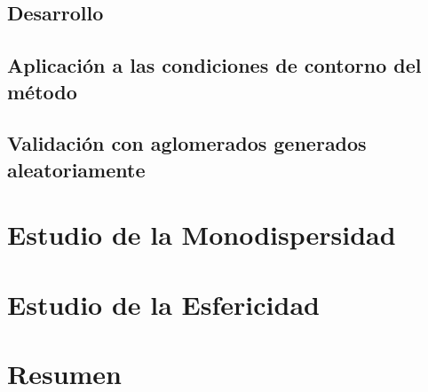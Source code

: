 \subsection{Desarrollo}
\subsection{Aplicación a las condiciones de contorno del método}
\subsection{Validación con aglomerados generados aleatoriamente}
\section{Estudio de la Monodispersidad}\label{sec:EstudioMonodispersidad}
\section{Estudio de la Esfericidad}\label{sec:EstudioEsfericidad}
\section{Resumen}



\newpage
%

% 
% 

